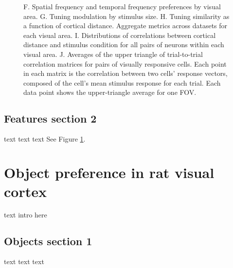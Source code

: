\documentclass{article}
\begin{document}
\begin{figure}[ht]
  F.  Spatial frequency and temporal frequency preferences by visual area.
  G.  Tuning modulation by stimulus size.
  H.  Tuning similarity as a function of cortical distance.  Aggregate metrics across datasets for each visual area.
  I.  Distributions of correlations between cortical distance and stimulus condition for all pairs of neurons within each visual area. 
  J.  Averages of the upper triangle of trial-to-trial correlation matrices for pairs of visually responsive cells. Each point in each matrix is the correlation between two cells’ response vectors, composed of the cell’s mean stimulus response for each trial. Each data point shows the upper-triangle average for one FOV.
  \label{fig:fig3}
\end{figure}

\subsection{Features section 2}
text text text
See Figure \ref{fig:fig3}.


\section{Object preference in rat visual cortex}
text intro here

\subsection{Objects section 1}
text text text
\end{document}
